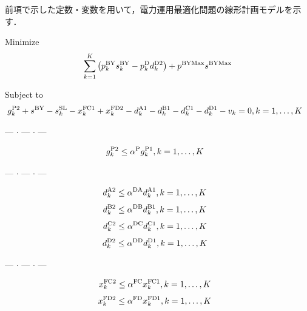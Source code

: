 \documentclass{jarticle}
\begin{document}
前項で示した定数・変数を用いて，電力運用最適化問題の線形計画モデルを示す．
%

\noindent
{\rm Minimize}
\begin{equation}
 \sum_{k=1}^{K} \left( p^{\rm BY}_{k}s^{\rm BY}_{k} - p^{\rm D}_{k}d^{\rm D2}_{k} \right) + p^{\rm BYMax} s^{\rm BYMax}
 \label{eq:minimize}
\end{equation}

\noindent
{\rm Subject to}
%
\begin{equation}
 g^{\rm P2}_{k} + s^{\rm BY} - s^{\rm SL}_{k}
 - x^{\rm FC1}_{k} + x^{\rm FD2}_{k} 
 - d^{\rm A1}_{k} - d^{\rm B1}_{k} - d^{\rm C1}_{k} - d^{\rm D1}_{k} - v_{k} = 0,
 \hfill
 k=1,\ldots,K
~~
\end{equation}
%
\begin{center} --- $ \cdot $ --- $ \cdot $ --- \end{center}
%
\begin{equation}
 g^{\rm P2}_{k} \le \alpha^{\rm P} g^{\rm P1}_{k} ,
 \hfill
 k=1,\ldots,K
 ~~
 \label{eq:gP1gP2}
\end{equation}
%
\begin{center} --- $ \cdot $ --- $ \cdot $ --- \end{center}
%
\begin{equation}
 d^{\rm A2}_{k} \le \alpha^{\rm DA} d^{\rm A1}_{k} ,
 \hfill
 k=1,\ldots,K
~~
 \label{eq:dA1A2}
\end{equation}
%
\begin{equation}
 d^{\rm B2}_{k} \le \alpha^{\rm DB} d^{\rm B1}_{k},
 \hfill
 k=1,\ldots,K
~~
 \label{eq:dB1B2}
\end{equation}
%
\begin{equation}
 d^{\rm C2}_{k} \le \alpha^{\rm DC} d^{\rm C1}_{k},
 \hfill
 k=1,\ldots,K
~~
 \label{eq:dC1C2}
\end{equation}
%
\begin{equation}
 d^{\rm D2}_{k} \le \alpha^{\rm DD} d^{\rm D1}_{k},
 \hfill
 k=1,\ldots,K
~~
 \label{eq:dD1D2}
\end{equation}
%
\begin{center} --- $ \cdot $ --- $ \cdot $ --- \end{center}
%
\begin{equation}
 x^{\rm FC2}_{k} \le \alpha^{\rm FC}x^{\rm FC1}_{k},
 \hfill
 k=1,\ldots,K
~~
 \label{eq:xFC1FC2}
\end{equation}
%
\begin{equation}
 x^{\rm FD2}_{k} \le \alpha^{\rm FD} x^{\rm FD1}_{k} ,
 \hfill
 k=1,\ldots,K
~~
 \label{eq:FD1FD2}
\end{equation}
\end{document}
